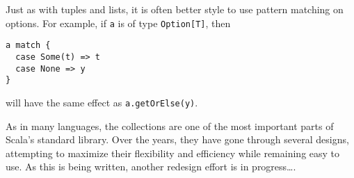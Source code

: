 \begin{itemize}
Just as with tuples and lists, it is often better style to use pattern matching on options. For example, if \texttt{a} is of type \texttt{Option[T]}, then
\begin{verbatim}
a match {
  case Some(t) => t
  case None => y
}
\end{verbatim}
will have the same effect as \texttt{a.getOrElse(y)}.

\end{itemize}

\begin{tailquote}
As in many languages, the collections are one of the most important parts of Scala's standard library. Over the years, they have gone through several designs, attempting to maximize their flexibility and efficiency while remaining easy to use. As this is being written, another redesign effort is in progress\ldots.
\end{tailquote}
